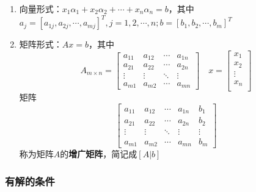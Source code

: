\documentclass[./linear_algebra.tex]{subfiles}
\begin{document}
    \begin{enumerate}
        \item 向量形式：$x_1\alpha_1 + x_2\alpha_2 + \cdots + x_n\alpha_n = b$，其中$a_j = [a_{1j}, a_{2j}, \cdots, a_{mj}]^T, j = 1, 2, \cdots, n; b = [b_1, b_2, \cdots, b_m]^T$
        \item 矩阵形式：$Ax = b$，其中
        \[
            A_{m\times n} = \begin{bmatrix}
                                a_{11} & a_{12} & \cdots & a_{1n} \\
                                a_{21} & a_{22} & \cdots & a_{2n} \\
                                \vdots & \vdots & \ddots & \vdots \\
                                a_{m1} & a_{m2} & \cdots & a_{mn}
            \end{bmatrix} \quad x = \begin{bmatrix}
                                        x_1 \\
                                        x_2 \\
                                        \vdots \\
                                        x_n \\
            \end{bmatrix}
        \]矩阵\[
                  \left[
                      \begin{array}{cccc|c}
                          a_{11} & a_{12} & \cdots & a_{1n} & b_1\\
                          a_{21} & a_{22} & \cdots & a_{2n} & b_2\\
                          \vdots & \vdots & \ddots & \vdots & \vdots\\
                          a_{m1} & a_{m2} & \cdots & a_{mn} & b_m
                      \end{array}
                  \right]
        \]称为矩阵$A$的\textbf{增广矩阵}，简记成$[A | b]$
    \end{enumerate}

    \subsubsection{有解的条件}
\end{document}
